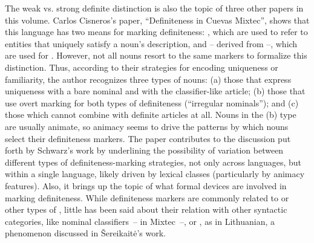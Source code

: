 \documentclass[output=paper]{langsci/langscibook}
\begin{document}
The weak vs. strong definite distinction is also the topic of three other papers in this volume. Carlos Cisneros’s paper, “Definiteness in Cuevas Mixtec”, shows that this  language has two means for marking definiteness: , which are used to refer to entities that uniquely satisfy a noun’s description, and   -- derived from  --, which are used for . However, not all nouns resort to the same markers to formalize this distinction. Thus, according to their strategies for encoding uniqueness or familiarity, the author recognizes three types of nouns: (a) those that express uniqueness with a bare nominal and  with the classifier-like article; (b) those that use overt marking for both types of definiteness (“irregular nominals”); and (c) those which cannot combine with definite articles at all. Nouns in the (b) type are usually animate, so animacy seems to drive the patterns by which nouns select their definiteness markers. The paper contributes to the discussion put forth by Schwarz’s work by underlining the possibility of variation between different types of definiteness-marking strategies, not only across languages, but within a single language, likely driven by lexical classes (particularly by animacy features). Also, it brings up the topic of what formal devices are involved in marking definiteness. While definiteness markers are commonly related to  or other types of , little has been said about their relation with other syntactic categories, like nominal classifiers~-- in Mixtec~--, or , as in Lithuanian, a phenomenon discussed in Šereikaitė’s work.\pagebreak 
\end{document}

